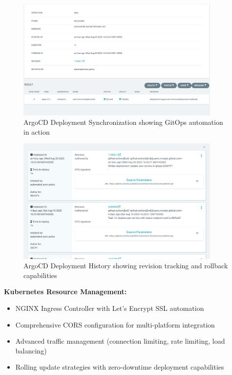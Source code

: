 \begin{figure}[H]
\centering
\includegraphics[width=0.9\textwidth]{figures/chapter5/argocd-deployment-sync.png}
\caption{ArgoCD Deployment Synchronization showing GitOps automation in action}
\label{fig:argocd-deployment-sync}
\end{figure}

\begin{figure}[H]
\centering
\includegraphics[width=0.9\textwidth]{figures/chapter5/argocd-deployment-history.png}
\caption{ArgoCD Deployment History showing revision tracking and rollback capabilities}
\label{fig:argocd-deployment-history}
\end{figure}


\textbf{Kubernetes Resource Management:}
\begin{itemize}
\item NGINX Ingress Controller with Let's Encrypt SSL automation
\item Comprehensive CORS configuration for multi-platform integration
\item Advanced traffic management (connection limiting, rate limiting, load balancing)
\item Rolling update strategies with zero-downtime deployment capabilities
\end{itemize}

